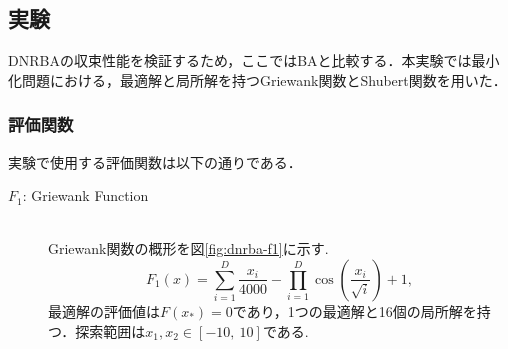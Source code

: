 \documentclass[a4j,11pt]{jarticle}
\begin{document}
\subsection{実験}
\label{ss:DNRBA-exp}
DNRBAの収束性能を検証するため，ここではBAと比較する．本実験では最小化問題における，最適解と局所解を持つGriewank関数とShubert関数を用いた．

\subsubsection{評価関数}
\label{sss:DNRBA-func}
実験で使用する評価関数は以下の通りである．

\begin{description}
\item[$F_1$: Griewank Function]\mbox{}\\
Griewank関数の概形を図\ref{fig:dnrba-f1}に示す.
\begin{equation}
F_1(x)= \sum_{i=1}^D \frac{x_{i}}{4000} - \prod_{i=1}^D \cos(\frac{x_i}{\sqrt{i}}) + 1,
\label{eq:dnrba-f1}
\end{equation}
最適解の評価値は${F(x_*)}=0$であり，1つの最適解と16個の局所解を持つ．探索範囲は$x_1, x_2 \in [-10, \ 10]$である.

\begin{figure}[h]
\centering
{}


\end{figure}
\end{description}
\end{document}
